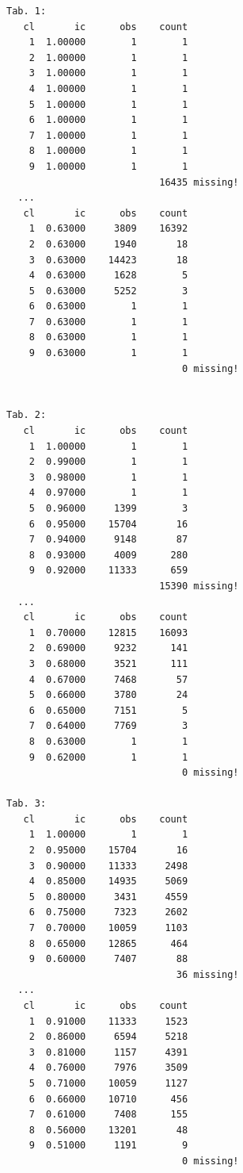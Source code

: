 \documentclass[12pt, oneside, a4paper, headsepline, plainheadsepline]{scrbook}
\begin{document}
\begin{lstlisting}
Tab. 1:
   cl       ic      obs    count
    1  1.00000        1        1
    2  1.00000        1        1
    3  1.00000        1        1
    4  1.00000        1        1
    5  1.00000        1        1
    6  1.00000        1        1
    7  1.00000        1        1
    8  1.00000        1        1
    9  1.00000        1        1
                           16435 missing!
  ...
   cl       ic      obs    count
    1  0.63000     3809    16392
    2  0.63000     1940       18
    3  0.63000    14423       18
    4  0.63000     1628        5
    5  0.63000     5252        3
    6  0.63000        1        1
    7  0.63000        1        1
    8  0.63000        1        1
    9  0.63000        1        1
                               0 missing!


Tab. 2:
   cl       ic      obs    count
    1  1.00000        1        1
    2  0.99000        1        1
    3  0.98000        1        1
    4  0.97000        1        1
    5  0.96000     1399        3
    6  0.95000    15704       16
    7  0.94000     9148       87
    8  0.93000     4009      280
    9  0.92000    11333      659
                           15390 missing!
  ...
   cl       ic      obs    count
    1  0.70000    12815    16093
    2  0.69000     9232      141
    3  0.68000     3521      111
    4  0.67000     7468       57
    5  0.66000     3780       24
    6  0.65000     7151        5
    7  0.64000     7769        3
    8  0.63000        1        1
    9  0.62000        1        1
                               0 missing!

Tab. 3:
   cl       ic      obs    count
    1  1.00000        1        1
    2  0.95000    15704       16
    3  0.90000    11333     2498
    4  0.85000    14935     5069
    5  0.80000     3431     4559
    6  0.75000     7323     2602
    7  0.70000    10059     1103
    8  0.65000    12865      464
    9  0.60000     7407       88
                              36 missing!
  ...
   cl       ic      obs    count
    1  0.91000    11333     1523
    2  0.86000     6594     5218
    3  0.81000     1157     4391
    4  0.76000     7976     3509
    5  0.71000    10059     1127
    6  0.66000    10710      456
    7  0.61000     7408      155
    8  0.56000    13201       48
    9  0.51000     1191        9
                               0 missing!
\end{lstlisting}
\end{document}
